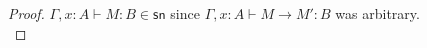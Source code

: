 \documentclass{article}
\newcommand{\csn}{\mathsf{sn}}
\newcommand{\red}{\longrightarrow}
\begin{document}
\begin{proof}
$\Gamma, x{:}A \vdash M : B \in \csn$ \hfill since $\Gamma, x{:}A \vdash M \red M' : B$ was arbitrary.
\\[1em]
%
%
%

\end{proof}
\end{document}
